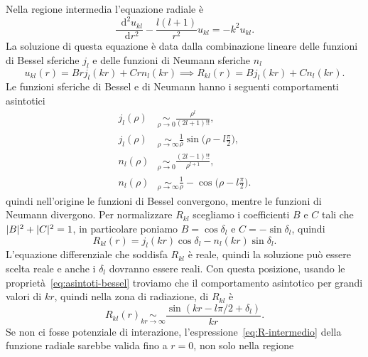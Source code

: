 \documentclass[a4paper,fleqn,twoside,12pt]{article}
\newcommand*{\dd}{\mathop{}\!\mathrm{d}} %
\DeclarePairedDelimiter{\abs}{\lvert}{\rvert}
\newcommand*{\toder}[3][]{\frac{{\dd^{#1}}#2}{\dd {#3}^{#1}}}
\begin{document}
Nella regione intermedia l'equazione radiale è
\begin{equation}
  \toder[2]{u_{kl}}{r} - \frac{l(l+1)}{r^{2}}u_{kl} = -k^{2}u_{kl}.
\end{equation}
La soluzione di questa equazione è data dalla combinazione lineare delle
funzioni di Bessel sferiche $j_{l}$ e delle funzioni di Neumann sferiche $n_{l}$
\begin{equation}
  u_{kl}(r) = Brj_{l}(kr) + Crn_{l}(kr) \implies R_{kl}(r) = Bj_{l}(kr) +
  Cn_{l}(kr).
\end{equation}
Le funzioni sferiche di Bessel e di Neumann hanno i seguenti comportamenti
asintotici
\begin{subequations}
  \label{eq:asintoti-bessel}
  \begin{align}
    j_{l}(\rho) &\underset{\rho \to 0}{\sim} \frac{\rho^{l}}{(2l+1)!!}, \\
    \label{eq:jl-asintotico}
    j_{l}(\rho) &\underset{\rho \to \infty}{\sim} \frac{1}{\rho} \sin\bigg(\rho
    - l \frac{\pi}{2}\bigg), \\
    n_{l}(\rho) &\underset{\rho \to 0}{\sim} \frac{(2l-1)!!}{\rho^{l+1}}, \\
    n_{l}(\rho) &\underset{\rho \to \infty}{\sim} \frac{1}{\rho} -\cos\bigg(\rho
    - l \frac{\pi}{2}\bigg).
  \end{align}
\end{subequations}
quindi nell'origine le funzioni di Bessel convergono, mentre le funzioni di
Neumann divergono.  Per normalizzare $R_{kl}$ scegliamo i coefficienti $B$ e $C$
tali che $\abs{B}^{2} + \abs{C}^{2} = 1$, in particolare poniamo
$B = \cos\delta_{l}$ e $C = -\sin\delta_{l}$, quindi
\begin{equation}
  \label{eq:R-intermedio}
  R_{kl}(r) = j_{l}(kr)\cos\delta_{l} - n_{l}(kr)\sin\delta_{l}.
\end{equation}
L'equazione differenziale che soddisfa $R_{kl}$ è reale, quindi la soluzione può
essere scelta reale e anche i $\delta_{l}$ dovranno essere reali.  Con questa
posizione, usando le proprietà~\eqref{eq:asintoti-bessel} troviamo che il
comportamento asintotico per grandi valori di $kr$, quindi nella zona di
radiazione, di $R_{kl}$ è
\begin{equation}
  \label{eq:R-asintotico}
  R_{kl}(r) \underset{kr \to \infty}{\sim} \frac{\sin(kr - l\pi/2 +
    \delta_{l})}{kr}.
\end{equation}
Se non ci fosse potenziale di interazione, l'espressione~\eqref{eq:R-intermedio}
della funzione radiale sarebbe valida fino a $r=0$, non solo nella regione
\end{document}
